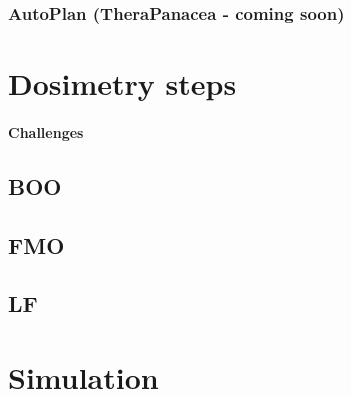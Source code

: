 \subsubsection{AutoPlan (TheraPanacea - coming soon)}

\section{Dosimetry steps}
\paragraph{Challenges}
\subsection{BOO}
\subsection{FMO}
\subsection{LF}

\section{Simulation}
